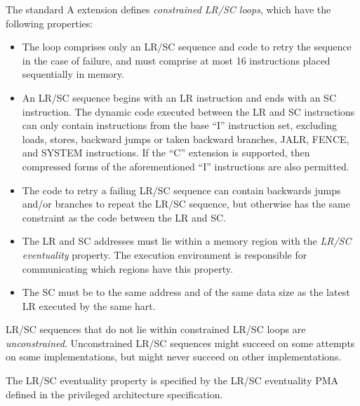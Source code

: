 The standard A extension defines {\em constrained LR/SC loops}, which have
the following properties:
\vspace{-0.2in}
\begin{itemize}
\parskip 0pt
\itemsep 1pt
\item The loop comprises only an LR/SC sequence and code to retry the sequence
  in the case of failure, and must comprise at most 16 instructions placed
  sequentially in memory.
\item An LR/SC sequence begins with an LR instruction and ends with an SC
  instruction.  The dynamic code executed between the LR and SC instructions
  can only contain instructions from the base ``I'' instruction set, excluding
  loads, stores, backward jumps or taken backward branches, JALR, FENCE, and
  SYSTEM instructions.  If the ``C'' extension is supported, then compressed
  forms of the aforementioned ``I'' instructions are also permitted.
\item The code to retry a failing LR/SC sequence can contain backwards jumps
  and/or branches to repeat the LR/SC sequence, but otherwise has the same
  constraint as the code between the LR and SC.
\item The LR and SC addresses must lie within a memory region with the {\em LR/SC
  eventuality} property.  The execution environment is responsible for
  communicating which regions have this property.
\item The SC must be to the same address and of the same data size as the
  latest LR executed by the same hart.
\end{itemize}

LR/SC sequences that do not lie within constrained LR/SC loops are {\em
unconstrained}.  Unconstrained LR/SC sequences might succeed on some attempts
on some implementations, but might never succeed on other implementations.

\begin{commentary}
The LR/SC eventuality property is specified by the LR/SC eventuality PMA
defined in the privileged architecture specification.
\end{commentary}

